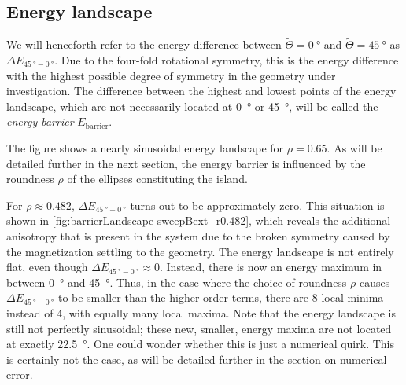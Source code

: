 \documentclass[11pt,a4paper,english]{article}
\begin{document}
\subsection{Energy landscape}
We will henceforth refer to the energy difference between $\widetilde{\Theta} = \SI{0}{\degree}$ and $\widetilde{\Theta} = \SI{45}{\degree}$ as $\Delta E_{\SI{45}{\degree}-\SI{0}{\degree}}$. Due to the four-fold rotational symmetry, this is the energy difference with the highest possible degree of symmetry in the geometry under investigation. The difference between the highest and lowest points of the energy landscape, which are not necessarily located at \SI{0}{\degree} or \SI{45}{\degree}, will be called the \textit{energy barrier} $E_\mathrm{barrier}$. \par
The figure shows a nearly sinusoidal energy landscape for $\rho=0.65$. As will be detailed further in the next section, the energy barrier is influenced by the roundness $\rho$ of the ellipses constituting the island. \par
For $\rho \approx 0.482$, $\Delta E_{\SI{45}{\degree}-\SI{0}{\degree}}$ turns out to be approximately zero. This situation is shown in \cref{fig:barrierLandscape-sweepBext_r0.482}, which reveals the additional anisotropy that is present in the system due to the broken symmetry caused by the magnetization settling to the geometry. The energy landscape is not entirely flat, even though $\Delta E_{\SI{45}{\degree}-\SI{0}{\degree}} \approx 0$. Instead, there is now an energy maximum in between \SI{0}{\degree} and \SI{45}{\degree}. Thus, in the case where the choice of roundness $\rho$ causes $\Delta E_{\SI{45}{\degree}-\SI{0}{\degree}}$ to be smaller than the higher-order terms, there are 8 local minima instead of 4, with equally many local maxima. Note that the energy landscape is still not perfectly sinusoidal; these new, smaller, energy maxima are not located at exactly \SI{22.5}{\degree}. One could wonder whether this is just a numerical quirk. This is certainly not the case, as will be detailed further in the section on numerical error.
\end{document}

